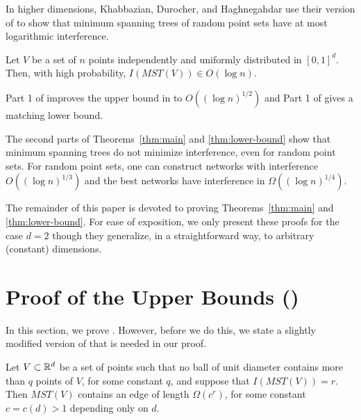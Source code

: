 \documentclass{patmorin}
\newcommand{\mst}{\mathit{MST}}
\begin{document}
In higher dimensions, Khabbazian, Durocher, and Haghnegahdar \cite{kdh11}
use their version of  to show that minimum spanning trees
of random point sets have at most logarithmic interference.
\begin{thm}
  Let $V$ be a set of $n$ points independently and uniformly distributed
  in $[0,1]^d$.  Then, with high probability, $I(\mst(V))\in O(\log n)$.
\end{thm}
Part 1 of  improves the upper bound in  to
$O((\log n)^{1/2})$ and Part 1 of  gives a matching
lower bound.

The second parts of Theorems~\ref{thm:main} and \ref{thm:lower-bound}
show that minimum spanning trees do not minimize interference, even for
random point sets.  For random point sets, one can construct networks with
interference $O((\log n)^{1/3})$ and the best networks have interference
in $\Omega((\log n)^{1/4})$.

The remainder of this paper is devoted to proving Theorems~\ref{thm:main}
and \ref{thm:lower-bound}.  For ease of exposition, we only present these
proofs for the case $d=2$ though they generalize, in a straightforward
way, to arbitrary (constant) dimensions.

\section{Proof of the Upper Bounds ()}

In this section, we prove .  However, before we do this,
we state a slightly modified version of  that is needed in
our proof.

\begin{lem}
  Let $V\subset\mathbb{R}^d$ be a set of points such that no ball of unit
  diameter contains more than $q$ points of $V$, for some constant $q$,
  and suppose that $I(MST(V))=r$.  Then $MST(V)$
  contains an edge of length $\Omega(c^r)$, for some constant $c=c(d)>1$
  depending only on $d$.
\end{lem}
\end{document}
